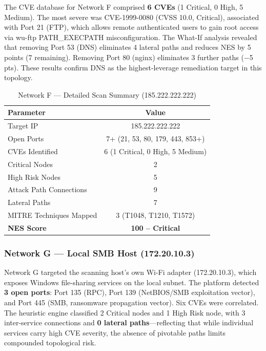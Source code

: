 \documentclass[conference]{IEEEtran}
\begin{document}
The CVE database for Network F comprised \textbf{6 CVEs} (1 Critical, 0 High, 5 Medium). The most severe was CVE-1999-0080 (CVSS 10.0, Critical), associated with Port 21 (FTP), which allows remote authenticated users to gain root access via wu-ftp PATH\_EXECPATH misconfiguration. The What-If analysis revealed that removing Port 53 (DNS) eliminates 4 lateral paths and reduces NES by 5 points (7 remaining). Removing Port 80 (nginx) eliminates 3 further paths ($-$5 pts). These results confirm DNS as the highest-leverage remediation target in this topology.

\begin{table}[htbp]
\caption{Network F --- Detailed Scan Summary (185.222.222.222)}
\begin{center}
\begin{tabular}{|l|c|}
\hline
\textbf{Parameter} & \textbf{Value} \\
\hline
Target IP & 185.222.222.222 \\
\hline
Open Ports & 7+ (21, 53, 80, 179, 443, 853+) \\
\hline
CVEs Identified & 6 (1 Critical, 0 High, 5 Medium) \\
\hline
Critical Nodes & 2 \\
\hline
High Risk Nodes & 5 \\
\hline
Attack Path Connections & 9 \\
\hline
Lateral Paths & 7 \\
\hline
MITRE Techniques Mapped & 3 (T1048, T1210, T1572) \\
\hline
\textbf{NES Score} & \textbf{100 -- Critical} \\
\hline
\end{tabular}
\label{tab:netF_detail}
\end{center}
\end{table}

\subsubsection{Network G --- Local SMB Host (172.20.10.3)}
Network G targeted the scanning host's own Wi-Fi adapter (172.20.10.3), which exposes Windows file-sharing services on the local subnet. The platform detected \textbf{3 open ports}: Port 135 (RPC), Port 139 (NetBIOS/SMB exploitation vector), and Port 445 (SMB, ransomware propagation vector). Six CVEs were correlated. The heuristic engine classified 2 Critical nodes and 1 High Risk node, with 3 inter-service connections and \textbf{0 lateral paths}---reflecting that while individual services carry high CVE severity, the absence of pivotable paths limits compounded topological risk.
\end{document}
